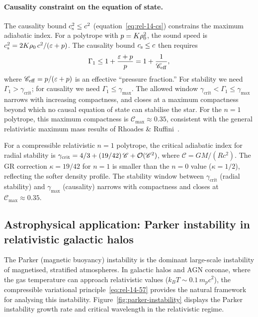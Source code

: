 \paragraph{Causality constraint on the equation of state.}
The causality bound $c_{\mathrm{s}}^{2} \leq c^{2}$
(equation~\eqref{eq:rel-14-cs}) constrains the maximum adiabatic
index.  For a polytrope with $p = K\rho_0^{2}$, the sound speed
is $c_{\mathrm{s}}^{2} = 2K\rho_0\,c^{2}/(\varepsilon + p)$.  The causality
bound $c_{\mathrm{s}} \leq c$ then requires
\begin{equation}
\Gamma_{1}
  \leq 1 + \frac{\varepsilon + p}{p}
  = 1 + \frac{1}{\mathscr{C}_{\mathrm{eff}}},
\label{eq:rel-14-gamma-max}
\end{equation}
where $\mathscr{C}_{\mathrm{eff}} = p/(\varepsilon + p)$ is an
effective ``pressure fraction.''  For stability we need
$\Gamma_{1} > \gamma_{\mathrm{crit}}$; for causality we need
$\Gamma_{1} \leq \gamma_{\max}$.  The allowed window
$\gamma_{\mathrm{crit}} < \Gamma_{1} \leq \gamma_{\max}$ narrows
with increasing compactness, and closes at a maximum compactness
beyond which no causal equation of state can stabilise the star.
For the $n = 1$ polytrope, this maximum compactness is
$\mathscr{C}_{\max} \approx 0.35$, consistent with the general
relativistic maximum mass results of Rhoades \&
Ruffini~\citep{Rhoades1974}.

\begin{relcorrection}
For a compressible relativistic $n = 1$ polytrope, the critical
adiabatic index for radial stability is
$\gamma_{\mathrm{crit}} = 4/3 + (19/42)\,\mathscr{C}
+ \mathcal{O}(\mathscr{C}^{2})$, where $\mathscr{C} = GM/(Rc^{2})$.
The GR correction $\kappa = 19/42$ for $n = 1$ is smaller than
the $n = 0$ value ($\kappa = 1/2$), reflecting the softer density
profile.  The stability window between $\gamma_{\mathrm{crit}}$
(radial stability) and $\gamma_{\max}$ (causality) narrows with
compactness and closes at $\mathscr{C}_{\max} \approx 0.35$.
\end{relcorrection}

\subsection{Astrophysical application: Parker instability in
  relativistic galactic halos}\label{sec:rel-123-astro}

The Parker (magnetic buoyancy) instability is the dominant
large-scale instability of magnetised, stratified atmospheres.
In galactic halos and AGN coronae, where the gas temperature can
approach relativistic values ($k_{B}T \sim 0.1\,m_{p}c^{2}$), the
compressible variational principle~\eqref{eq:rel-14-57} provides the
natural framework for analysing this instability.
Figure~\ref{fig:parker-instability} displays the Parker instability
growth rate and critical wavelength in the relativistic regime.

